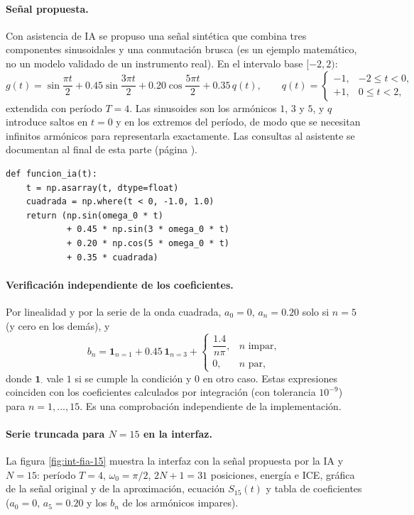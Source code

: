 \documentclass[11pt]{article}
\begin{document}
\paragraph{Señal propuesta.}
Con asistencia de IA se propuso una señal sintética que combina tres componentes sinusoidales y una conmutación brusca
(es un ejemplo matemático, no un modelo validado de un instrumento real). En el intervalo base $[-2,2)$:
\begin{equation}
 g(t)=\sin\frac{\pi t}{2}+0.45\sin\frac{3\pi t}{2}+0.20\cos\frac{5\pi t}{2}+0.35\,q(t),\qquad
 q(t)=\begin{cases}-1,&-2\le t<0,\\ +1,&0\le t<2,\end{cases}
\end{equation}
extendida con período $T=4$. Las sinusoides son los armónicos $1$, $3$ y $5$, y $q$ introduce saltos en $t=0$ y en los
extremos del período, de modo que se necesitan infinitos armónicos para representarla exactamente. Las consultas
al asistente se documentan al final de esta parte (página \pageref{anexo:ia}).

\begin{lstlisting}
def funcion_ia(t):
    t = np.asarray(t, dtype=float)
    cuadrada = np.where(t < 0, -1.0, 1.0)
    return (np.sin(omega_0 * t)
            + 0.45 * np.sin(3 * omega_0 * t)
            + 0.20 * np.cos(5 * omega_0 * t)
            + 0.35 * cuadrada)
\end{lstlisting}

\paragraph{Verificación independiente de los coeficientes.}
Por linealidad y por la serie de la onda cuadrada, $a_0=0$, $a_n=0.20$ solo si $n=5$ (y cero en los demás), y
\[
 b_n=\mathbf 1_{n=1}+0.45\,\mathbf 1_{n=3}+\begin{cases}\dfrac{1.4}{n\pi},&n\text{ impar},\\[2mm]0,&n\text{ par},\end{cases}
\]
donde $\mathbf 1_{\cdot}$ vale $1$ si se cumple la condición y $0$ en otro caso. Estas expresiones coinciden con los
coeficientes calculados por integración (con tolerancia $10^{-9}$) para $n=1,\dots,15$. Es una comprobación independiente
de la implementación.

\paragraph{Serie truncada para $N=15$ en la interfaz.}
La figura \ref{fig:int-fia-15} muestra la interfaz con la señal propuesta por la IA y $N=15$: período $T=4$, $\omega_0=\pi/2$,
$2N+1=31$ posiciones, energía e ICE, gráfica de la señal original y de la aproximación, ecuación $S_{15}(t)$ y tabla de
coeficientes ($a_0=0$, $a_5=0.20$ y los $b_n$ de los armónicos impares).
\end{document}
